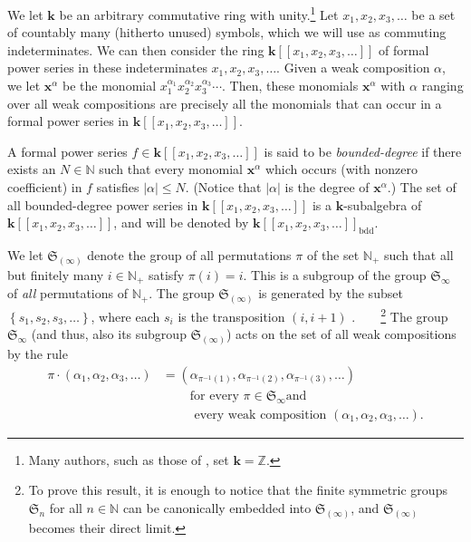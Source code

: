 \documentclass[numbers=enddot,12pt,final,onecolumn,notitlepage]{scrartcl}%
\theoremstyle{definition}
\newenvironment{verlong}{}{}
\begin{document}
\begin{verlong}
We let $\mathbf{k}$ be an arbitrary commutative ring with unity.\footnote{Many
authors, such as those of \cite{LamPyl}, set $\mathbf{k}=\mathbb{Z}$.} Let
$x_{1},x_{2},x_{3},\ldots$ be a set of countably many (hitherto unused)
symbols, which we will use as commuting indeterminates. We can then consider
the ring $\mathbf{k}\left[  \left[  x_{1},x_{2},x_{3},\ldots\right]  \right]
$ of formal power series in these indeterminates $x_{1},x_{2},x_{3},\ldots$.
Given a weak composition $\alpha$, we let $\mathbf{x}^{\alpha}$ be the
monomial $x_{1}^{\alpha_{1}}x_{2}^{\alpha_{2}}x_{3}^{\alpha_{3}}\cdots$. Then,
these monomials $\mathbf{x}^{\alpha}$ with $\alpha$ ranging over all weak
compositions are precisely all the monomials that can occur in a formal power
series in $\mathbf{k}\left[  \left[  x_{1},x_{2},x_{3},\ldots\right]  \right]
$.
\end{verlong}

A formal power series $f\in\mathbf{k}\left[  \left[  x_{1},x_{2},x_{3}%
,\ldots\right]  \right]  $ is said to be \textit{bounded-degree} if there
exists an $N\in\mathbb{N}$ such that every monomial $\mathbf{x}^{\alpha}$
which occurs (with nonzero coefficient) in $f$ satisfies $\left\vert
\alpha\right\vert \leq N$. (Notice that $\left\vert \alpha\right\vert $ is the
degree of $\mathbf{x}^{\alpha}$.) The set of all bounded-degree power series
in $\mathbf{k}\left[  \left[  x_{1},x_{2},x_{3},\ldots\right]  \right]  $ is a
$\mathbf{k}$-subalgebra of $\mathbf{k}\left[  \left[  x_{1},x_{2},x_{3}%
,\ldots\right]  \right]  $, and will be denoted by $\mathbf{k}\left[  \left[
x_{1},x_{2},x_{3},\ldots\right]  \right]  _{\operatorname*{bdd}}$.

We let $\mathfrak{S}_{\left(  \infty\right)  }$ denote the group of all
permutations $\pi$ of the set $\mathbb{N}_{+}$ such that all but finitely many
$i\in\mathbb{N}_{+}$ satisfy $\pi\left(  i\right)  =i$. This is a subgroup of
the group $\mathfrak{S}_{\infty}$ of \textit{all} permutations of
$\mathbb{N}_{+}$. The group $\mathfrak{S}_{\left(  \infty\right)  }$ is
generated by the subset $\left\{  s_{1},s_{2},s_{3},\ldots\right\}  $, where
each $s_{i}$ is the transposition $\left(  i,i+1\right)  $%
.\ \ \ \ \footnote{To prove this result, it is enough to notice that the
finite symmetric groups $\mathfrak{S}_{n}$ for all $n\in\mathbb{N}$ can be
canonically embedded into $\mathfrak{S}_{\left(  \infty\right)  }$, and
$\mathfrak{S}_{\left(  \infty\right)  }$ becomes their direct limit.} The
group $\mathfrak{S}_{\infty}$ (and thus, also its subgroup $\mathfrak{S}%
_{\left(  \infty\right)  }$) acts on the set of all weak compositions by the
rule%
\begin{align*}
\pi\cdot\left(  \alpha_{1},\alpha_{2},\alpha_{3},\ldots\right)   &  =\left(
\alpha_{\pi^{-1}\left(  1\right)  },\alpha_{\pi^{-1}\left(  2\right)  }%
,\alpha_{\pi^{-1}\left(  3\right)  },\ldots\right) \\
&  \ \ \ \ \ \ \ \ \ \ \text{for every }\pi\in\mathfrak{S}_{\infty}\text{
and}\\
&  \ \ \ \ \ \ \ \ \ \ \text{ every weak composition }\left(  \alpha
_{1},\alpha_{2},\alpha_{3},\ldots\right)  .
\end{align*}
\end{document}
